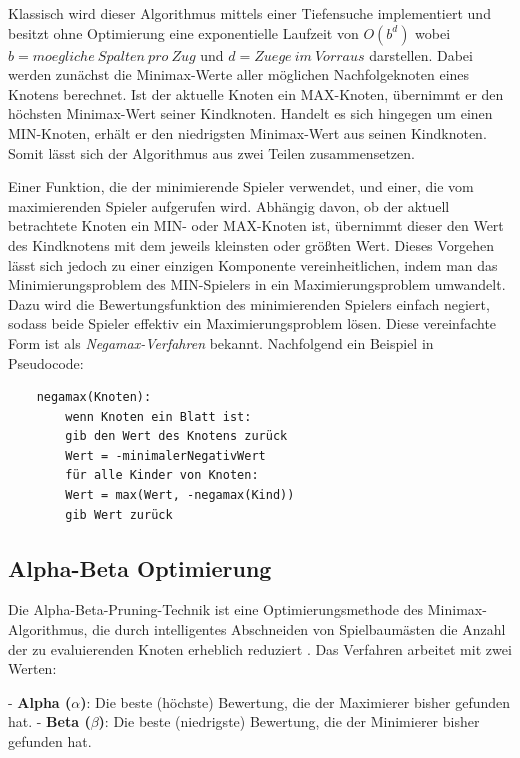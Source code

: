 \newpage 

Klassisch wird dieser Algorithmus mittels einer Tiefensuche implementiert und besitzt ohne Optimierung eine exponentielle Laufzeit von $O(b^d)$ wobei $b=moegliche \ Spalten \ pro \ Zug$ und $d=Zuege \ im \ Vorraus$ darstellen. Dabei werden zunächst die Minimax-Werte aller möglichen Nachfolgeknoten eines Knotens berechnet. Ist der aktuelle Knoten ein MAX-Knoten, übernimmt er den höchsten Minimax-Wert seiner Kindknoten. Handelt es sich hingegen um einen MIN-Knoten, erhält er den niedrigsten Minimax-Wert aus seinen Kindknoten. Somit lässt sich der Algorithmus aus zwei Teilen zusammensetzen. 

Einer Funktion, die der minimierende Spieler verwendet, und einer, die vom maximierenden Spieler aufgerufen wird. Abhängig davon, ob der aktuell betrachtete Knoten ein MIN- oder MAX-Knoten ist, übernimmt dieser den Wert des Kindknotens mit dem jeweils kleinsten oder größten Wert. Dieses Vorgehen lässt sich jedoch zu einer einzigen Komponente vereinheitlichen, indem man das Minimierungsproblem des MIN-Spielers in ein Maximierungsproblem umwandelt. Dazu wird die Bewertungsfunktion des minimierenden Spielers einfach negiert, sodass beide Spieler effektiv ein Maximierungsproblem lösen. Diese vereinfachte Form ist als \textit{Negamax-Verfahren} bekannt. Nachfolgend ein Beispiel in Pseudocode:

\begin{verbatim}
	negamax(Knoten):
		wenn Knoten ein Blatt ist:
		gib den Wert des Knotens zurück
		Wert = -minimalerNegativWert
		für alle Kinder von Knoten:
		Wert = max(Wert, -negamax(Kind))
		gib Wert zurück
\end{verbatim}

\newpage

\subsection{Alpha-Beta Optimierung}
\label{alphabeta}
Die Alpha-Beta-Pruning-Technik ist eine Optimierungsmethode des Minimax-Algorithmus, die durch intelligentes Abschneiden von Spielbaumästen die Anzahl der zu evaluierenden Knoten erheblich reduziert \cite{KNUTH1975293}. Das Verfahren arbeitet mit zwei Werten:

- \textbf{Alpha ($\alpha$)}: Die beste (höchste) Bewertung, die der Maximierer bisher gefunden hat.\newline
- \textbf{Beta ($\beta$)}: Die beste (niedrigste) Bewertung, die der Minimierer bisher gefunden hat.

